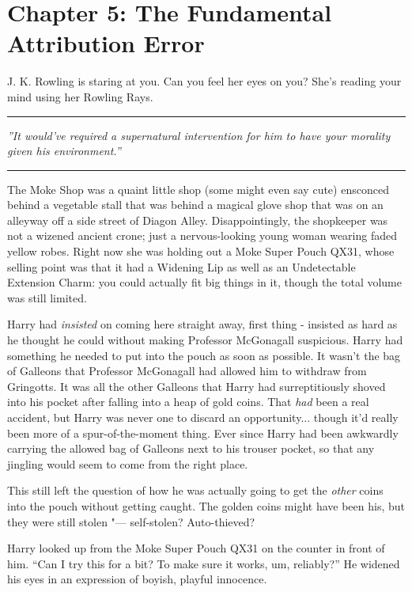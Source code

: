 \chapter{Chapter 5: The Fundamental Attribution Error}
J. K. Rowling is staring at you. Can you feel her eyes on you? She's
reading your mind using her Rowling Rays.

\begin{center}\rule{3in}{0.4pt}\end{center}

\emph{''It would've required a \emph{supernatural intervention} for him
to have \emph{your} morality given \emph{his} environment.''}

\begin{center}\rule{3in}{0.4pt}\end{center}

The Moke Shop was a quaint little shop (some might even say cute)
ensconced behind a vegetable stall that was behind a magical glove shop
that was on an alleyway off a side street of Diagon Alley.
Disappointingly, the shopkeeper was not a wizened ancient crone; just a
nervous-looking young woman wearing faded yellow robes. Right now she
was holding out a Moke Super Pouch QX31, whose selling point was that it
had a Widening Lip as well as an Undetectable Extension Charm: you could
actually fit big things in it, though the total volume was still
limited.

Harry had \emph{insisted} on coming here straight away, first thing -
insisted as hard as he thought he could without making Professor
McGonagall suspicious. Harry had something he needed to put into the
pouch as soon as possible. It wasn't the bag of Galleons that Professor
McGonagall had allowed him to withdraw from Gringotts. It was all the
other Galleons that Harry had surreptitiously shoved into his pocket
after falling into a heap of gold coins. That \emph{had} been a real
accident, but Harry was never one to discard an opportunity...
though it'd really been more of a spur-of-the-moment thing. Ever since
Harry had been awkwardly carrying the allowed bag of Galleons next to
his trouser pocket, so that any jingling would seem to come from the
right place.

This still left the question of how he was actually going to get the
\emph{other} coins into the pouch without getting caught. The golden
coins might have been his, but they were still stolen "--- self-stolen?
Auto-thieved?

Harry looked up from the Moke Super Pouch QX31 on the counter in front
of him. ``Can I try this for a bit? To make sure it works, um,
reliably?'' He widened his eyes in an expression of boyish, playful
innocence.

